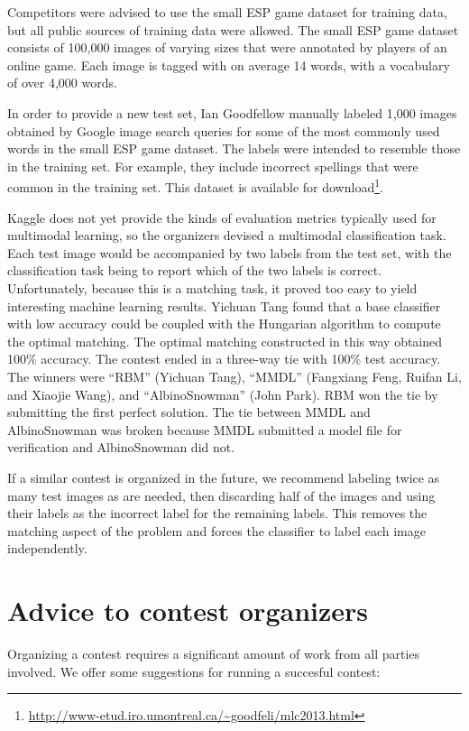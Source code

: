 \documentclass{llncs}
\begin{document}
Competitors were advised to use the small ESP game dataset \citep{vonAhn2004} for training data,
but all public sources of training data were allowed. The small ESP game dataset consists of 100,000
images of varying sizes that were annotated by players of an online game. Each image is tagged with
on average 14 words, with a vocabulary of over 4,000 words.

In order to provide a new test set, Ian Goodfellow manually labeled 1,000 images obtained by Google
image search queries for some of the most commonly used words in the small ESP game dataset. The
labels were intended to resemble those in the training set. For example, they include incorrect
spellings that were common in the training set. This dataset is available for download\footnote{\tiny{\url{http://www-etud.iro.umontreal.ca/~goodfeli/mlc2013.html}}}.


Kaggle does not yet provide the kinds of evaluation metrics typically used for multimodal learning, so
the organizers devised a multimodal classification task. Each test image would be accompanied by two labels
from the test set, with the classification task being to report which of the two labels is
correct. Unfortunately, because this is a matching task, it proved too easy to yield interesting
machine learning results. Yichuan Tang found that a base classifier with low accuracy could be coupled
with the Hungarian algorithm to compute the optimal matching. The optimal matching constructed in
this way obtained 100\% accuracy.
The contest ended in a three-way tie with 100\% test accuracy. The winners were ``RBM'' (Yichuan Tang),
``MMDL'' \citep{Feng-wkshp-2013} (Fangxiang Feng, Ruifan Li, and Xiaojie Wang), and ``AlbinoSnowman'' (John Park). RBM won the
tie by submitting the first perfect solution. The tie between MMDL and AlbinoSnowman was broken
because MMDL submitted a model file for verification and AlbinoSnowman did not.

If a similar contest is organized in the future, we recommend labeling twice as many test images as
are needed, then discarding half of the images and using their labels as the incorrect label for the
remaining labels. This removes the matching aspect of the problem and forces the classifier to label
each image independently.


\section{Advice to contest organizers}

Organizing a contest requires a significant amount of work from all parties involved.
We offer some suggestions for running a succesful contest:
\end{document}
